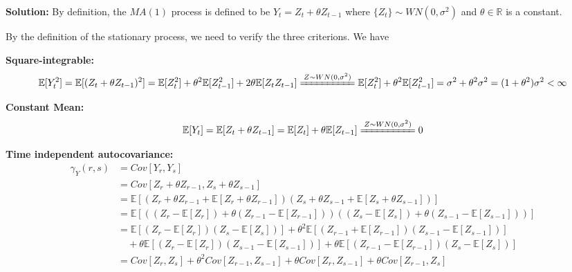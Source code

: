 \documentclass[11pt]{article}
\theoremstyle{plain} %
\newenvironment{solution}
{\color{C2}\normalfont\begin{framed}\begingroup\textbf{Solution:} }
  {\endgroup\end{framed}}
\theoremstyle{remark}
\newcommand{\EE}{\mathbb{E}}
\begin{document}
\begin{solution}
	By definition, the $MA(1)$ process is defined to be $Y_{t} = Z_{t} + \theta Z_{t-1}$ where $\{Z_{t}\}\sim WN(0, \sigma^{2})$ and $\theta \in \mathbb{R}$ is a constant.

	By the definition of the stationary process, we need to verify the three criterions. We have
	\begin{enumerate}[label=(\roman*)]{
		\item  \textbf{Square-integrable:}
		      $$
			      \EE[Y_{t}^{2}] = \EE[(Z_{t} + \theta Z_{t-1})^{2}] = \EE[Z_{t}^{2}]+\theta^{2}\EE[Z_{t-1}^{2}] + 2\theta\EE[Z_{t}Z_{t-1}] \xlongequal{Z\sim WN(0, \sigma^{2})} \EE[Z_{t}^{2}]+\theta^{2}\EE[Z_{t-1}^{2}] = \sigma^{2}+\theta^{2}\sigma^{2} = (1+\theta^{2})\sigma^{2} <\infty
		      $$
		\item \textbf{Constant Mean:}
		      $$
			      \EE[Y_{t}] = \EE[Z_{t} + \theta Z_{t-1}] = \EE[Z_{t}]+ \theta\EE[Z_{t-1}]\xlongequal{Z\sim WN(0, \sigma^{2})} 0
		      $$
		\item \textbf{Time independent autocovariance:}
		      \begin{align*}
			      \gamma_{Y}(r,s) & = Cov[Y_{r}, Y_{s}]                                                                                                                       \\
			                      & = Cov[Z_{r} + \theta Z_{r-1}, Z_{s} + \theta Z_{s-1}]                                                                                     \\
			                      & = \EE[\left(Z_{r} + \theta Z_{r-1} + \EE[Z_{r} + \theta Z_{r-1}]\right)\left(Z_{s} + \theta Z_{s-1} + \EE[Z_{s} + \theta Z_{s-1}]\right)] \\
			                      & = \EE[\left((Z_{r}-\EE[Z_{r}])+\theta(Z_{r-1}-\EE[Z_{r-1}])\right)\left((Z_{s}-\EE[Z_{s}])+\theta(Z_{s-1}-\EE[Z_{s-1}]) \right)]          \\
			                      & = \EE[(Z_{r}-\EE[Z_{r}])(Z_{s}-\EE[Z_{s}])] + \theta^{2}\EE[(Z_{r-1}+\EE[Z_{r-1}])(Z_{s-1}-\EE[Z_{s-1}])]                                 \\
			                      & \quad + \theta\EE[(Z_{r}-\EE[Z_{r}])(Z_{s-1}-\EE[Z_{s-1}])]+ \theta\EE[(Z_{r-1}-\EE[Z_{r-1}])(Z_{s}-\EE[Z_{s}])]                          \\
			                      & = Cov[Z_{r}, Z_{s}] + \theta^{2} Cov[Z_{r-1}, Z_{s-1}] + \theta Cov[Z_{r}, Z_{s-1}] + \theta Cov[Z_{r-1}, Z_{s}]                          \\

\end{align*}}
\end{enumerate}
\end{solution}
\end{document}
